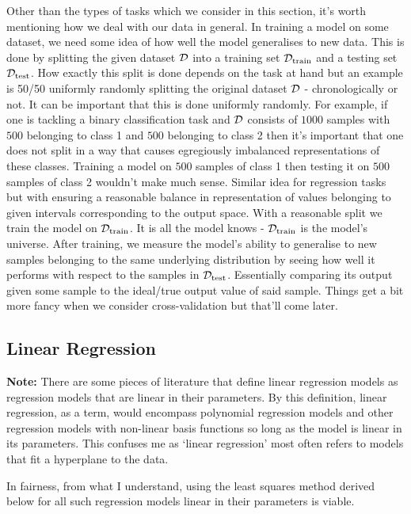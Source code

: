 \documentclass[11pt]{article}
\begin{document}
Other than the types of tasks which we consider in this section, it's worth mentioning how we deal with our data in general. In training a model on some dataset, we need some idea of how well the model generalises to new data. This is done by splitting the given dataset $\mathcal{D}$ into a training set $\mathcal{D}_{\text{train}}$ and a testing set $\mathcal{D}_{\text{test}}$. How exactly this split is done depends on the task at hand but an example is 50/50 uniformly randomly splitting the original dataset $\mathcal{D}$ - chronologically or not. It can be important that this is done uniformly randomly. For example, if one is tackling a binary classification task and $\mathcal{D}$ consists of $1000$ samples with $500$ belonging to class 1 and $500$ belonging to class 2 then it's important that one does not split in a way that causes egregiously imbalanced representations of these classes. Training a model on $500$ samples of class 1 then testing it on $500$ samples of class 2 wouldn't make much sense. Similar idea for regression tasks but with ensuring a reasonable balance in representation of values belonging to given intervals corresponding to the output space. With a reasonable split we train the model on $\mathcal{D}_{\text{train}}$. It is all the model knows - $\mathcal{D}_{\text{train}}$ is the model's universe. After training, we measure the model's ability to generalise to new samples belonging to the same underlying distribution by seeing how well it performs with respect to the samples in $\mathcal{D}_{\text{test}}$. Essentially comparing its output given some sample to the ideal/true output value of said sample. Things get a bit more fancy when we consider cross-validation but that'll come later.

\subsection{Linear Regression}

\textbf{Note:} There are some pieces of literature that define linear regression models as regression models that are linear in their parameters. By this definition, linear regression, as a term, would encompass polynomial regression models and other regression models with non-linear basis functions so long as the model is linear in its parameters. This confuses me as `linear regression' most often refers to models that fit a hyperplane to the data.

In fairness, from what I understand, using the least squares method derived below for all such regression models linear in their parameters is viable.\\
\end{document}
